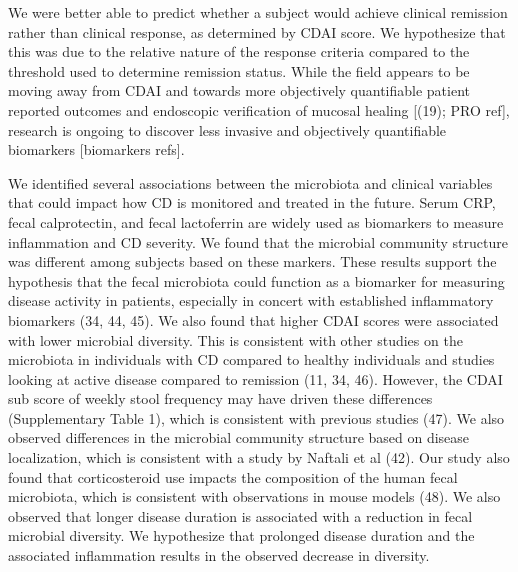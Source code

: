 \documentclass[12pt,]{article}
\begin{document}
We were better able to predict whether a subject would achieve clinical
remission rather than clinical response, as determined by CDAI score. We
hypothesize that this was due to the relative nature of the response
criteria compared to the threshold used to determine remission status.
While the field appears to be moving away from CDAI and towards more
objectively quantifiable patient reported outcomes and endoscopic
verification of mucosal healing {[}(19); PRO ref{]}, research is ongoing
to discover less invasive and objectively quantifiable biomarkers
{[}biomarkers refs{]}.

We identified several associations between the microbiota and clinical
variables that could impact how CD is monitored and treated in the
future. Serum CRP, fecal calprotectin, and fecal lactoferrin are widely
used as biomarkers to measure inflammation and CD severity. We found
that the microbial community structure was different among subjects
based on these markers. These results support the hypothesis that the
fecal microbiota could function as a biomarker for measuring disease
activity in patients, especially in concert with established
inflammatory biomarkers (34, 44, 45). We also found that higher CDAI
scores were associated with lower microbial diversity. This is
consistent with other studies on the microbiota in individuals with CD
compared to healthy individuals and studies looking at active disease
compared to remission (11, 34, 46). However, the CDAI sub score of
weekly stool frequency may have driven these differences (Supplementary
Table 1), which is consistent with previous studies (47). We also
observed differences in the microbial community structure based on
disease localization, which is consistent with a study by Naftali et al
(42). Our study also found that corticosteroid use impacts the
composition of the human fecal microbiota, which is consistent with
observations in mouse models (48). We also observed that longer disease
duration is associated with a reduction in fecal microbial diversity. We
hypothesize that prolonged disease duration and the associated
inflammation results in the observed decrease in diversity.
\end{document}
